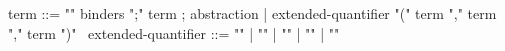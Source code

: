 \begin{syntax}
term ::= {"\lambda" binders ";" term} ; abstraction
| {extended-quantifier "(" term "," term "," term ")"}
\
extended-quantifier ::= {"\max"} | {"\min"} | {"\sum"} | {"\product"}
                      | {"\numof"}
\end{syntax}